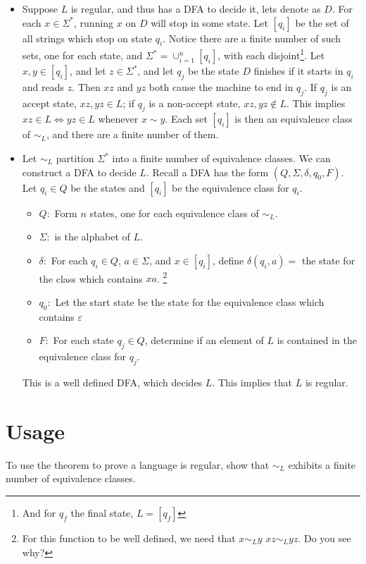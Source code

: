 \documentclass[11pt]{article}
\begin{document}
\begin{itemize}
    \item[$(\implies)$] Suppose $L$ is regular, and thus has a DFA to decide it, lets denote as $D$. For each $x \in \Sigma^*$, running $x$ on $D$ will stop in some state. Let $[q_i]$ be the set of all strings which stop on state $q_i$. Notice there are a finite number of such sets, one for each state, and $\Sigma^* = \cup_{i = 1}^n [q_i]$, with each disjoint\footnote{And for $q_f$ the final state, $L = [q_f]$}. Let $x,y \in [q_i]$, and let $z \in \Sigma^*$, and let $q_j$ be the state $D$ finishes if it starts in $q_i$ and reads $z$. Then $xz$ and $yz$ both cause the machine to end in $q_j$. If $q_j$ is an accept state, $xz, yz \in L$; if $q_j$ is a non-accept state, $xz, yz \notin L$. This implies $xz \in L \iff yz \in L$ whenever $x \sim y$. Each set $[q_i]$ is then an equivalence class of $\sim_L$, and there are a finite number of them. 
    \item[$(\impliedby)$] Let $\sim_L$ partition $\Sigma^*$ into a finite number of equivalence classes. We can construct a DFA to decide $L$. Recall a DFA has the form $(Q, \Sigma, \delta, q_0, F)$. Let $q_i \in Q$ be the states and $[q_i]$ be the equivalence class for $q_i$. 
    
    \begin{itemize}
        \item $Q:$ Form $n$ states, one for each equivalence class of $\sim_L$. 
        \item $\Sigma:$ is the alphabet of $L$. 
        \item $\delta:$ For each $q_i \in Q$, $a \in \Sigma$, and $x \in [q_i]$, define $\delta(q_i,a)= $ the state for the class which contains $xa$.  \footnote{For this function to be well defined, we need that $x \sim_L y$ \implies $xz \sim_L yz$. Do you see why?}
        
        \item $q_0:$ Let the start state be the state for the equivalence class which contains $\varepsilon$
        
        \item $F:$ For each state $q_j \in Q$, determine if an element of $L$ is contained in the equivalence class for $q_j$. 
    \end{itemize}
    This is a well defined DFA, which decides $L$. This implies that $L$ is regular. 
\end{itemize}

\section{Usage}
To use the theorem to prove a language is regular, show that $\sim_L$ exhibits a finite number of equivalence classes.
\end{document}
